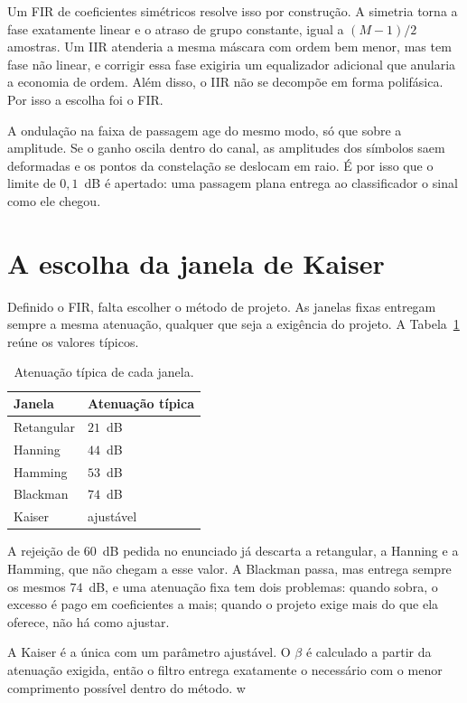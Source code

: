 Um FIR de coeficientes simétricos resolve isso por construção. A simetria torna a fase exatamente linear e o atraso de grupo constante, igual a $(M-1)/2$ amostras. Um IIR atenderia a mesma máscara com ordem bem menor, mas tem fase não linear, e corrigir essa fase exigiria um equalizador adicional que anularia a economia de ordem. Além disso, o IIR não se decompõe em forma polifásica. Por isso a escolha foi o FIR.

A ondulação na faixa de passagem age do mesmo modo, só que sobre a amplitude. Se o ganho oscila dentro do canal, as amplitudes dos símbolos saem deformadas e os pontos da constelação se deslocam em raio. É por isso que o limite de $0{,}1$~dB é apertado: uma passagem plana entrega ao classificador o sinal como ele chegou.

\section{A escolha da janela de Kaiser}

Definido o FIR, falta escolher o método de projeto. As janelas fixas entregam sempre a mesma atenuação, qualquer que seja a exigência do projeto. A Tabela~\ref{tab:janelas} reúne os valores típicos.

\begin{table}[htb]
\centering
\caption{Atenuação típica de cada janela.}
\label{tab:janelas}
\begin{tabular}{ll}
\hline
\textbf{Janela} & \textbf{Atenuação típica} \\
\hline
Retangular & $21$~dB \\
Hanning & $44$~dB \\
Hamming & $53$~dB \\
Blackman & $74$~dB \\
Kaiser & ajustável \\
\hline
\end{tabular}
\end{table}

A rejeição de $60$~dB pedida no enunciado já descarta a retangular, a Hanning e a Hamming, que não chegam a esse valor. A Blackman passa, mas entrega sempre os mesmos $74$~dB, e uma atenuação fixa tem dois problemas: quando sobra, o excesso é pago em coeficientes a mais; quando o projeto exige mais do que ela oferece, não há como ajustar.

A Kaiser é a única com um parâmetro ajustável. O $\beta$ é calculado a partir da atenuação exigida, então o filtro entrega exatamente o necessário com o menor comprimento possível dentro do método.
w